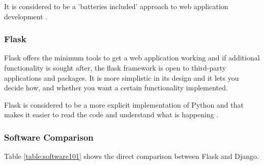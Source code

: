 It is considered to be a 'batteries included' approach to web application development \cite{dwyer_flask_nodate}.


\subsubsection{Flask}
Flask offers the minimum tools to get a web application working and if additional functionality is sought after, the flask framework is open to third-party applications and packages. It is more simplistic in its design and it lets you decide how, and whether you want a certain functionality implemented. 

Flask is considered to be a more explicit implementation of Python and that makes it easier to read the code and understand what is happening \cite{dwyer_flask_nodate}.

\subsubsection{Software Comparison}
Table \ref{table:software101} shows the direct comparison between Flask and Django.

